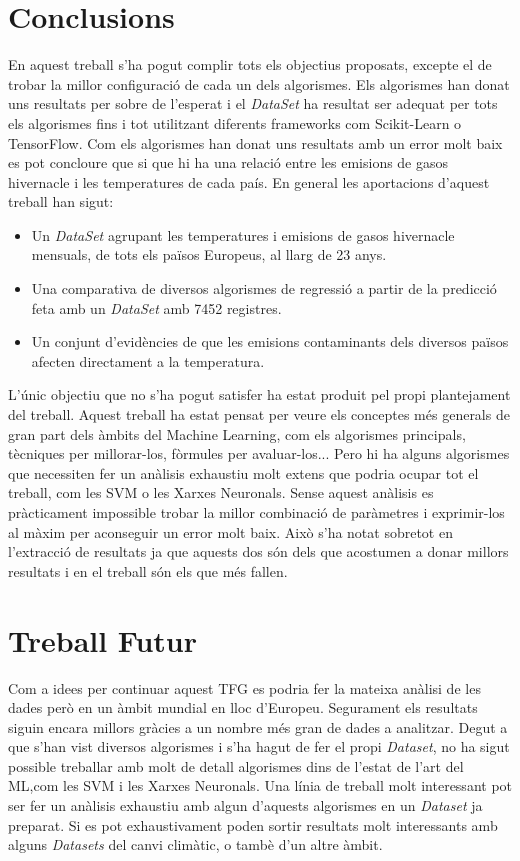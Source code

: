 \documentclass[10pt,a4paper,twocolumn,twoside]{article}
\begin{document}
\section {Conclusions}
En aquest treball s'ha pogut complir tots els objectius proposats, excepte el de trobar la millor configuració de cada un dels algorismes. Els algorismes han donat uns resultats per sobre de l'esperat i el \textit{DataSet} ha resultat ser adequat per tots els algorismes fins i tot utilitzant diferents frameworks com Scikit-Learn o TensorFlow. Com els algorismes han donat uns resultats amb un error molt baix es pot concloure que si que hi ha una relació entre les emisions de gasos hivernacle i les temperatures de cada país. En general les aportacions d'aquest treball han sigut:
\begin{itemize}
\item Un \textit{DataSet} agrupant les temperatures i emisions de gasos hivernacle mensuals, de tots els països Europeus, al llarg de 23 anys.
\item Una comparativa de diversos algorismes de regressió a partir de la predicció feta amb un \textit{DataSet} amb 7452 registres.
\item Un conjunt d'evidències de que les emisions contaminants dels diversos països afecten directament a la temperatura. 
\end{itemize}
L'únic objectiu que no s'ha pogut satisfer ha estat produit pel propi plantejament del treball. Aquest treball ha estat pensat per veure els conceptes més generals de gran part dels àmbits del Machine Learning, com els algorismes principals, tècniques per millorar-los, fòrmules per avaluar-los... Pero hi ha alguns algorismes que necessiten fer un anàlisis exhaustiu molt extens que podria ocupar tot el treball, com les SVM o les Xarxes Neuronals. Sense aquest anàlisis es pràcticament impossible trobar la millor combinació de paràmetres i exprimir-los al màxim per aconseguir un error molt baix. Això s'ha notat sobretot en l'extracció de resultats ja que aquests dos són dels que acostumen a donar millors resultats i en el treball són els que més fallen.

\section{Treball Futur}
Com a idees per continuar aquest TFG es podria fer la mateixa anàlisi de les dades però en un àmbit mundial en lloc d'Europeu. Segurament els resultats siguin encara millors gràcies a un nombre més gran de dades a analitzar. Degut a que s'han vist diversos algorismes i s'ha hagut de fer el propi \textit{Dataset}, no ha sigut possible treballar amb molt de detall algorismes dins de l'estat de l'art del ML,com les SVM i les Xarxes Neuronals. Una línia de treball molt interessant pot ser fer un anàlisis exhaustiu amb algun d'aquests algorismes en un \textit{Dataset} ja preparat. Si es pot exhaustivament poden sortir resultats molt interessants amb alguns \textit{Datasets} del canvi climàtic, o tambè d'un altre àmbit.
\end{document}
